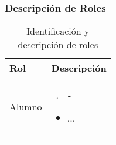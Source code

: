 \newpage
\subsubsection{Descripción de Roles}


\begin{longtable}{|p{5cm}|p{11cm}|}%
		\hline
			\textbf{Rol} & \textbf{Descripción}\\ %
		\hline\hline %
			{Alumno} & {--.----
\begin{itemize}
\item ...
\end{itemize}

}\\ %
		\hline

\caption{Identificación y descripción de roles}
\end{longtable}
